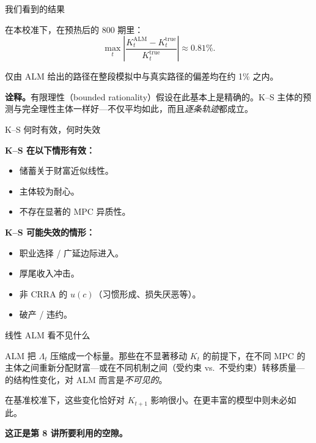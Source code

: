 \documentclass[10pt,aspectratio=169]{beamer}
\begin{document}
\begin{frame}{我们看到的结果}

在本校准下，在预热后的 800 期里：
\[
  \max_t \left|\frac{K_t^{\text{ALM}} - K_t^{\text{true}}}{K_t^{\text{true}}}\right| \approx 0.81\%.
\]

\smallskip

仅由 ALM 给出的路径在整段模拟中与真实路径的偏差均在约 1\% 之内。

\smallskip

\textbf{诠释。}有限理性（bounded rationality）假设在此基本上是精确的。K--S 主体的预测与完全理性主体一样好---不仅平均如此，而且\emph{逐条轨迹}都成立。

\end{frame}

\begin{frame}{K--S 何时有效，何时失效}

\textbf{K--S 在以下情形有效：}

\begin{itemize}
  \item 储蓄关于财富近似线性。
  \item 主体较为耐心。
  \item 不存在显著的 MPC 异质性。
\end{itemize}

\textbf{K--S 可能失效的情形：}

\begin{itemize}
  \item 职业选择 / 广延边际进入。
  \item 厚尾收入冲击。
  \item 非 CRRA 的 $u(c)$（习惯形成、损失厌恶等）。
  \item 破产 / 违约。
\end{itemize}

\end{frame}

\begin{frame}{线性 ALM 看不见什么}

ALM 把 $\Lambda_t$ 压缩成一个标量。那些在不显著移动 $K_t$ 的前提下，在不同 MPC 的主体之间重新分配财富---或在不同机制之间（受约束 vs.\ 不受约束）转移质量---的结构性变化，对 ALM 而言是\emph{不可见的}。

\smallskip

在基准校准下，这些变化恰好对 $K_{t+1}$ 影响很小。在更丰富的模型中则未必如此。

\smallskip

\textbf{这正是第 8 讲所要利用的空隙。}

\end{frame}
\end{document}
